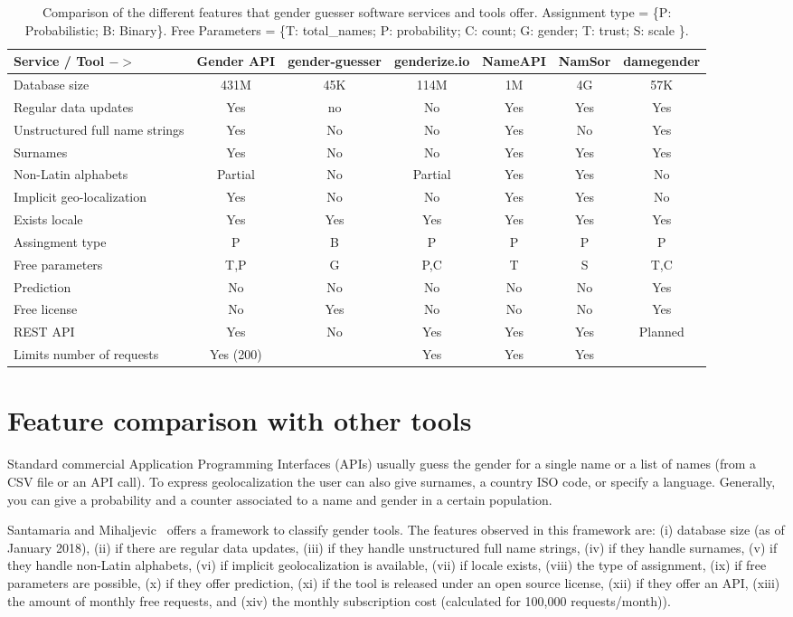 \documentclass[a4paper]{article}
\def\infinity{\rotatebox{90}{8}}
\begin{document}
\begin{table*}[ht]
\footnotesize
\begin{tabular}[]{lcccccc}
\hline
Service / Tool $->$ & Gender API & gender-guesser & genderize.io & NameAPI & NamSor & damegender\tabularnewline
\hline
Database size & 431M & 45K & 114M & 1M & 4G & 57K \tabularnewline
Regular data updates & Yes & no & No & Yes & Yes & Yes\tabularnewline
Unstructured full name strings & Yes & No & No & Yes & No & Yes\tabularnewline
Surnames & Yes & No & No & Yes & Yes & Yes\tabularnewline
Non-Latin alphabets & Partial & No & Partial & Yes & Yes & No\tabularnewline
Implicit geo-localization & Yes & No & No & Yes & Yes & No\tabularnewline
Exists locale & Yes & Yes & Yes & Yes & Yes & Yes\tabularnewline
Assingment type & P & B & P & P & P & P \tabularnewline
Free parameters & T,P & G & P,C & T & S & T,C\tabularnewline
Prediction & No & No & No & No & No & Yes\tabularnewline
Free license & No & Yes & No & No & No & Yes\tabularnewline
REST API & Yes & No & Yes & Yes & Yes & Planned\tabularnewline
Limits number of requests & Yes (200) & \infinity & Yes & Yes & Yes & \infinity \tabularnewline
\hline
\end{tabular}
\caption{Comparison of the different features that gender guesser software services and tools offer. Assignment type = \{P: Probabilistic; B: Binary\}. Free Parameters = \{T: total\_names; P: probability; C: count; G: gender; T: trust; S: scale \}. }
\label{table:comparison}
\end{table*}


\section{Feature comparison with other tools}

Standard commercial Application Programming Interfaces (APIs) usually guess the gender for a single name or a list of names (from a CSV file or an API call). 
To express geolocalization the user can also give surnames, a country ISO code, or specify a language.
Generally, you can give a probability and a counter associated to a name and gender in a certain population.

Santamaria and Mihaljevic~\cite{10.7717/peerj-cs.156} offers a framework to classify gender tools.
The features observed in this framework are: (i) database size (as of January 2018), (ii) if there are regular data updates, (iii) if they handle unstructured full name strings, (iv) if they handle surnames, (v) if they handle non-Latin alphabets, (vi) if implicit geolocalization is available, (vii) if locale exists, (viii) the type of assignment, (ix) if free parameters are possible, (x) if they offer prediction, (xi) if the tool is released under an open source license, (xii) if they offer an API, (xiii) the amount of monthly free requests, and (xiv) the monthly subscription cost (calculated for 100,000 requests/month)).
\end{document}
